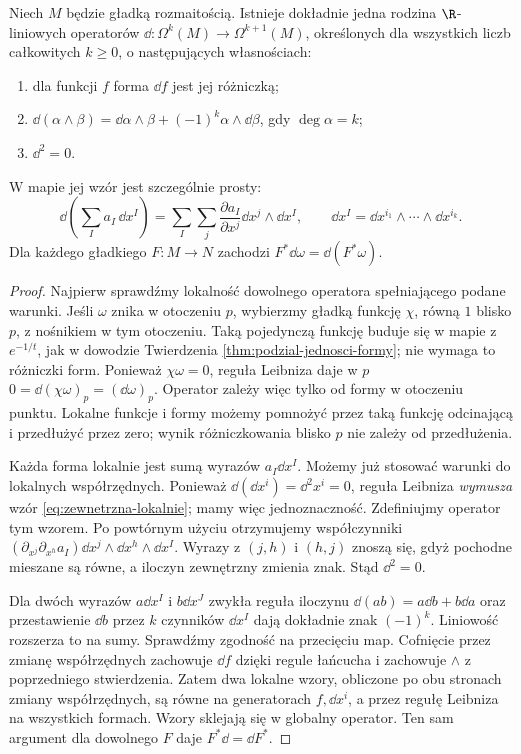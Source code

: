 \begin{twierdzenie}
\label{thm:formy-d}
Niech $M$ będzie gładką rozmaitością.
Istnieje dokładnie jedna rodzina $\R$-liniowych
operatorów $\dd:\Omega^k(M)\to\Omega^{k+1}(M)$,
określonych dla wszystkich liczb całkowitych $k\geq0$,
o następujących własnościach:
\begin{enumerate}[leftmargin=*]
\item dla funkcji $f$ forma $\dd f$ jest jej różniczką;
\item $\dd(\alpha\wedge\beta)=\dd\alpha\wedge\beta
 +(-1)^k\alpha\wedge\dd\beta$, gdy $\deg\alpha=k$;
\item $\dd^2=0$.
\end{enumerate}
W mapie jej wzór jest szczególnie prosty:
\begin{equation}\label{eq:zewnetrzna-lokalnie}
 \dd\!\left(\sum_I a_I\,\dd x^I\right)
  =\sum_I\sum_j\frac{\partial a_I}{\partial x^j}
     \dd x^j\wedge\dd x^I,
 \qquad \dd x^I=\dd x^{i_1}\wedge\cdots\wedge\dd x^{i_k}.
\end{equation}
Dla każdego gładkiego $F:M\to N$ zachodzi
$F^*\dd\omega=\dd(F^*\omega)$.
\end{twierdzenie}
\begin{proof}
Najpierw sprawdźmy lokalność dowolnego operatora spełniającego
podane warunki. Jeśli $\omega$ znika w otoczeniu $p$, wybierzmy
gładką funkcję $\chi$, równą $1$ blisko $p$, z nośnikiem
w tym otoczeniu. Taką pojedynczą funkcję buduje się w mapie
z $e^{-1/t}$, jak w dowodzie Twierdzenia
\ref{thm:podzial-jednosci-formy}; nie wymaga to różniczki form.
Ponieważ $\chi\omega=0$, reguła Leibniza daje w $p$
$0=\dd(\chi\omega)_p=(\dd\omega)_p$.
Operator zależy więc tylko od formy w otoczeniu punktu.
Lokalne funkcje i formy możemy pomnożyć przez taką funkcję
odcinającą i przedłużyć przez zero; wynik różniczkowania
blisko $p$ nie zależy od przedłużenia.

Każda forma lokalnie jest sumą wyrazów $a_I\dd x^I$.
Możemy już stosować warunki do lokalnych współrzędnych.
Ponieważ $\dd(\dd x^i)=\dd^2x^i=0$,
reguła Leibniza \emph{wymusza} wzór
\eqref{eq:zewnetrzna-lokalnie}; mamy więc jednoznaczność.
Zdefiniujmy operator tym wzorem. Po powtórnym użyciu
otrzymujemy współczynniki
$(\partial_{x^j}\partial_{x^h}a_I)
\dd x^j\wedge\dd x^h\wedge\dd x^I$.
Wyrazy z $(j,h)$ i $(h,j)$ znoszą się, gdyż pochodne
mieszane są równe, a iloczyn zewnętrzny zmienia znak.
Stąd $\dd^2=0$.

Dla dwóch wyrazów $a\dd x^I$ i $b\dd x^J$
zwykła reguła iloczynu $\dd(ab)=a\dd b+b\dd a$
oraz przestawienie $\dd b$ przez $k$ czynników
$\dd x^I$ dają dokładnie znak $(-1)^k$.
Liniowość rozszerza to na sumy.
Sprawdźmy zgodność na przecięciu map. Cofnięcie przez
zmianę współrzędnych zachowuje $\dd f$ dzięki regule
łańcucha i zachowuje $\wedge$ z poprzedniego
stwierdzenia. Zatem dwa lokalne wzory, obliczone po obu
stronach zmiany współrzędnych, są równe na generatorach
$f,\dd x^i$, a przez regułę Leibniza na wszystkich formach.
Wzory sklejają się w globalny operator. Ten sam argument
dla dowolnego $F$ daje $F^*\dd=\dd F^*$.
\end{proof}

